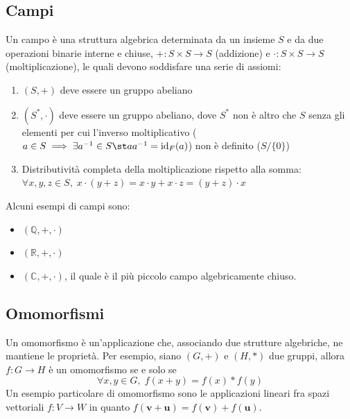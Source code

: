 \subsection{Campi} \label{subsec:fields}
    Un campo è una struttura algebrica determinata da un insieme $S$ e da due operazioni binarie interne e chiuse, $+ : S \times S \rightarrow S$ (addizione)  e $\cdot : S \times S \rightarrow S$ (moltiplicazione), le quali devono soddisfare una serie di assiomi:
    \begin{enumerate}[label=(\arabic*)]
        \item $(S, +)$ deve essere un gruppo abeliano
        \item $(S^*, \cdot)$ deve essere un gruppo abeliano, dove $S^*$ non è altro che $S$ senza gli elementi per cui l'inverso moltiplicativo ($a \in S \implies \exists a^{-1} \in S \st aa^{-1} = \textnormal{id}_{F}(a)$) non è definito ($S / \{0\}$)
        \item Distributività completa della moltiplicazione rispetto alla somma: $\forall x, y, z \in S, \; x \cdot (y + z) = x \cdot y + x \cdot z = (y + z) \cdot x$
    \end{enumerate}

    \vspace{10pt}
    Alcuni esempi di campi sono:
    \begin{itemize}
        \item $(\mathbb{Q}, +, \cdot)$
        \item $(\mathbb{R}, +, \cdot)$
        \item $(\mathbb{C}, +, \cdot)$, il quale è il più piccolo campo algebricamente chiuso.
    \end{itemize}



\subsection{Omomorfismi} \label{subsec:homomorphisms}
    Un omomorfismo è un'applicazione che, associando due strutture algebriche, ne mantiene le proprietà.
    Per esempio, siano $(G, +)$ e $(H, *)$ due gruppi,
    allora $f: G \rightarrow H$ è un omomorfismo se e solo se
    \[
        \forall x, y \in G, \; f(x + y) = f(x) * f(y)
    \]
    Un esempio particolare di omomorfismo sono le applicazioni lineari fra spazi vettoriali $f: V \rightarrow W$ in quanto $f(\mathbf{v} + \mathbf{u}) = f(\mathbf{v}) + f(\mathbf{u})$.
